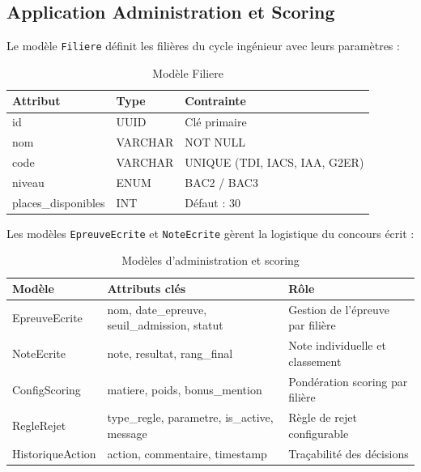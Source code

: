 \subsection{Application Administration et Scoring}
\label{application-administration-et-scoring}

Le modèle \texttt{Filiere} définit les filières du cycle ingénieur avec leurs paramètres :

\begin{table}[htbp]
  \centering
  \caption{Modèle Filiere}
  \begin{tabularx}{\textwidth}{@{} l l X @{}}
    \toprule
    \textbf{Attribut} & \textbf{Type} & \textbf{Contrainte} \\
    \midrule
    id & UUID & Clé primaire \\
    nom & VARCHAR & NOT NULL \\
    code & VARCHAR & UNIQUE (TDI, IACS, IAA, G2ER) \\
    niveau & ENUM & BAC2 / BAC3 \\
    places\_disponibles & INT & Défaut : 30 \\
    \bottomrule
  \end{tabularx}
  \label{tab:model-filiere}
\end{table}

Les modèles \texttt{EpreuveEcrite} et \texttt{NoteEcrite} gèrent la logistique du concours écrit :

\begin{table}[htbp]
  \centering
  \caption{Modèles d'administration et scoring}
  \begin{tabularx}{\textwidth}{@{} l l X @{}}
    \toprule
    \textbf{Modèle} & \textbf{Attributs clés} & \textbf{Rôle} \\
    \midrule
    EpreuveEcrite & nom, date\_epreuve, seuil\_admission, statut & Gestion de l'épreuve par filière \\
    NoteEcrite & note, resultat, rang\_final & Note individuelle et classement \\
    ConfigScoring & matiere, poids, bonus\_mention & Pondération scoring par filière \\
    RegleRejet & type\_regle, parametre, is\_active, message & Règle de rejet configurable \\
    HistoriqueAction & action, commentaire, timestamp & Traçabilité des décisions \\
    \bottomrule
  \end{tabularx}
  \label{tab:model-admin}
\end{table}

